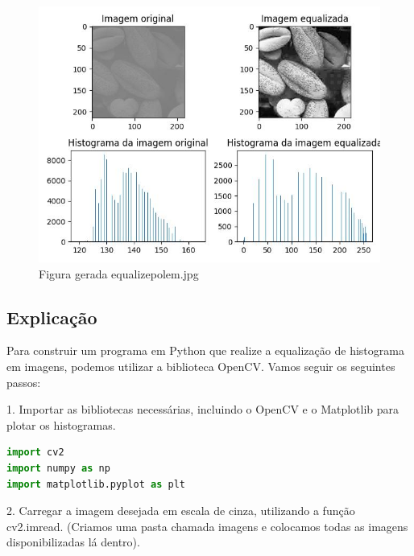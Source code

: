 \documentclass[10pt,a4paper]{article}
\begin{document}
\begin{figure}[H]
    \centering
    \includegraphics[scale=0.7]{images_generate/05/equalize_polem.jpg}
    \caption{Figura gerada equalize\textunderscore polem.jpg}
\end{figure}

\subsection{Explicação}

\begin{flushleft}
Para construir um programa em Python que realize a equalização de histograma em imagens, podemos utilizar a biblioteca OpenCV. Vamos seguir os seguintes passos:
\end{flushleft}

\begin{flushleft}    
1. Importar as bibliotecas necessárias, incluindo o OpenCV e o Matplotlib para plotar os histogramas.
\end{flushleft}

\begin{lstlisting}[language=Python]      
import cv2
import numpy as np
import matplotlib.pyplot as plt
\end{lstlisting}

\begin{flushleft}
2. Carregar a imagem desejada em escala de cinza, utilizando a função cv2.imread. (Criamos uma pasta chamada imagens e colocamos todas as imagens disponibilizadas lá dentro).
\end{flushleft}
\end{document}
